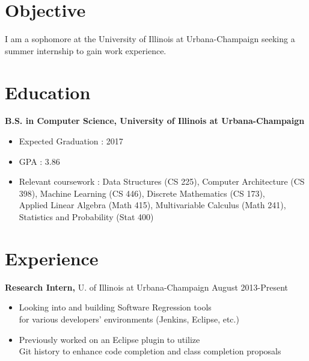 \documentclass[margin]{res}
\begin{document}
 
 

\address{{\bf Present Address} \\ 512 S. 3rd St. \\ Urbana, Il 61820}
\address{{\bf Permanent Address} \\ 6147 Alcante Dr. \\ San Jose, CA 95129}

 
\begin{resume} 
 
\section{Objective} 
I am a sophomore at the University of Illinois at Urbana-Champaign seeking a summer internship to gain work experience.

\section{Education} 
{\bf B.S. in Computer Science, University of Illinois at Urbana-Champaign}
\begin{itemize} \itemsep -2pt %
\item Expected Graduation : 2017
\item GPA : 3.86
\item Relevant coursework : Data Structures (CS 225), Computer Architecture (CS 398), Machine Learning (CS 446), 
Discrete Mathematics (CS 173), \\Applied Linear Algebra (Math 415), Multivariable Calculus (Math 241), \\Statistics and Probability (Stat 400)
\end{itemize}
 

\section{Experience}
 {\bf Research Intern,} U. of Illinois at Urbana-Champaign \hfill August 2013-Present
 \begin{itemize} \itemsep -2pt  %
 \item Looking into and building Software Regression tools \\for various developers' environments (Jenkins, Eclipse, etc.)
 \item Previously worked on an Eclipse plugin to utilize \\Git history to enhance code completion and class completion proposals
 \end{itemize}
 

\end{resume}
\end{document}
